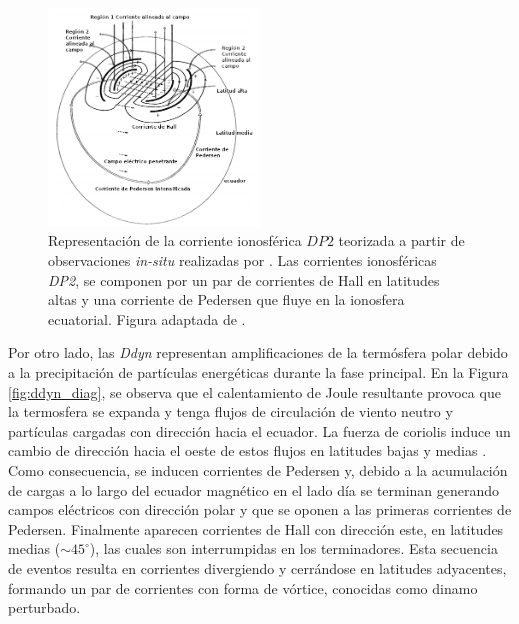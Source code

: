 \begin{figure}
	\centering
	\includegraphics[width=0.5\textwidth]{Images/dp2_edited.png}
	\caption{Representación de la corriente ionosférica $DP2$ teorizada a partir de observaciones \textit{in-situ} realizadas por \cite{nishida_68_fluctuations, nishida_andobayashi_67,nishida_68_coherence}. Las corrientes ionosféricas \emph{DP2}, se componen por un par de corrientes de Hall en latitudes altas y una corriente de Pedersen que fluye en la ionosfera ecuatorial. Figura adaptada de \cite{dp2_diag}.}
	\label{fig:dp2_diag}
\end{figure}


Por otro lado, las \emph{Ddyn} representan amplificaciones de la termósfera polar debido a la precipitación de partículas energéticas durante la fase principal. En la Figura \ref{fig:ddyn_diag}, se observa que el calentamiento de Joule resultante provoca que la termosfera se expanda y tenga  flujos de circulación de viento neutro y partículas cargadas con dirección hacia el ecuador. La fuerza de coriolis induce un cambio de dirección hacia el oeste de estos flujos en latitudes bajas y medias \cite{blanc_ddyn, ddyn2005, angeoddyn}. Como consecuencia, se inducen corrientes de Pedersen y, debido a la acumulación de cargas a lo largo del ecuador magnético en el lado día se terminan generando  campos eléctricos con dirección polar y que se oponen a las primeras corrientes de Pedersen. Finalmente aparecen corrientes de Hall con dirección este, en latitudes medias ($\sim 45^\circ$), las cuales son interrumpidas en los  terminadores\cite{blanc_ddyn}. Esta secuencia de eventos resulta en corrientes divergiendo y cerrándose en latitudes adyacentes, formando un par de corrientes con forma de vórtice, conocidas como dinamo perturbado.
\vspace{1 em}

